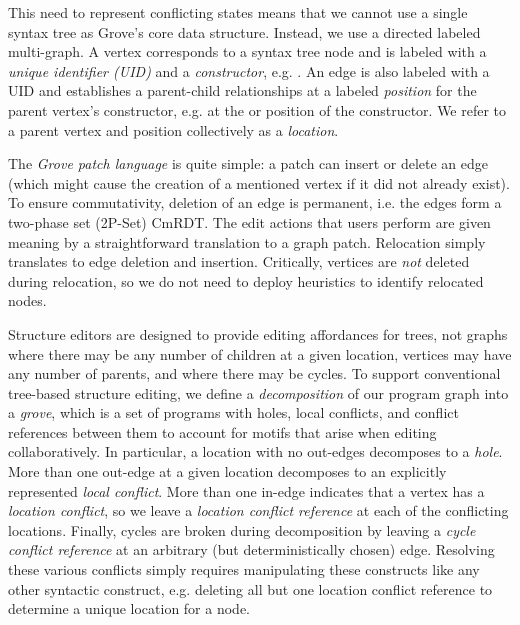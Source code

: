 This need to represent conflicting states means that we cannot use a single syntax tree as Grove's 
core data structure. Instead, we use a directed labeled multi-graph. A vertex corresponds to a syntax tree node and is labeled with a \emph{unique identifier (UID)} and a \emph{constructor}, e.g. . An edge is also labeled with a UID and establishes a parent-child relationships at a labeled \emph{position} for the parent vertex's constructor, e.g. at the  or  position of the  constructor. We refer to a parent vertex and position collectively as a \emph{location}.

The \emph{Grove patch language} is quite simple: a patch can insert or delete an edge (which might cause the creation of a mentioned vertex if it did not already exist). 
To ensure commutativity, deletion of an edge is permanent, i.e.
the edges form a two-phase set (2P-Set) CmRDT. The edit actions that users perform are given meaning by a straightforward translation to a graph patch. 
Relocation simply translates to 
edge deletion and insertion. Critically, vertices are \emph{not} deleted during relocation,
so we do not need to deploy heuristics to identify relocated nodes.

Structure editors are designed to provide editing affordances for trees, not graphs where there may be any number of children at a given location, vertices may have any number of parents, and where there may be cycles. 
To support conventional tree-based structure editing, 
we define a \emph{decomposition} of our program graph into a \emph{grove}, which is a set of 
programs with holes, local conflicts, and conflict references between them to account for motifs that arise when editing collaboratively. 
In particular, a location with no out-edges decomposes to a \emph{hole}. 
More than one out-edge at a given location decomposes to an explicitly represented \emph{local conflict}. 
More than one in-edge indicates that a vertex has a \emph{location conflict}, so we leave a \emph{location conflict reference} at each of the conflicting locations. 
Finally, cycles are broken during decomposition by leaving a \emph{cycle conflict reference} at an arbitrary (but deterministically chosen) edge. 
Resolving these various conflicts simply requires 
manipulating these constructs like any other syntactic construct, e.g. deleting all but one location conflict reference to determine a unique location for a node. 

